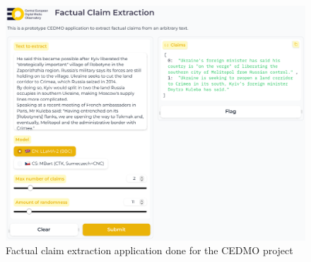 %
%
\begin{figure}
    \includegraphics[width=16cm]{fig/cedmo.pdf}
    \caption{Factual claim extraction application done for the CEDMO project}
    \label{fig:claimgencedmo}
\end{figure}

